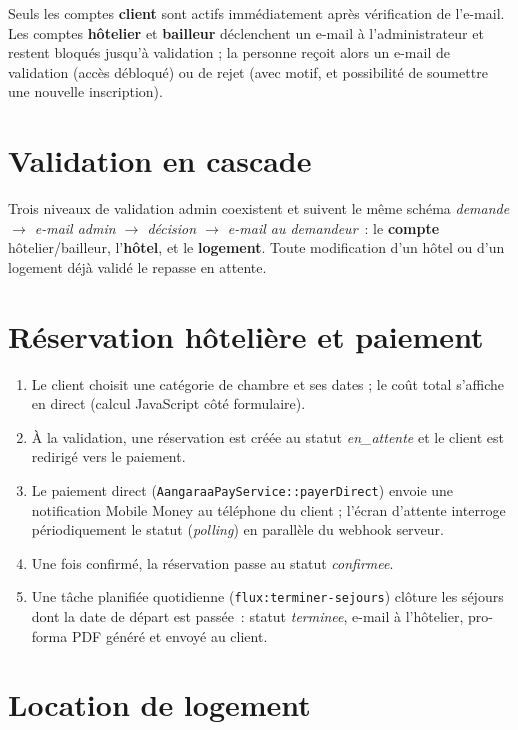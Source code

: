 \documentclass[11pt,a4paper]{report}
\newcommand{\tech}[1]{\texttt{\small #1}}
\begin{document}
Seuls les comptes \textbf{client} sont actifs immédiatement après vérification de l'e-mail. Les comptes \textbf{hôtelier} et \textbf{bailleur} déclenchent un e-mail à l'administrateur et restent bloqués jusqu'à validation ; la personne reçoit alors un e-mail de validation (accès débloqué) ou de rejet (avec motif, et possibilité de soumettre une nouvelle inscription).

\section{Validation en cascade}

\begin{noteviolet}
Trois niveaux de validation admin coexistent et suivent le même schéma \emph{demande $\rightarrow$ e-mail admin $\rightarrow$ décision $\rightarrow$ e-mail au demandeur}~: le \textbf{compte} hôtelier/bailleur, l'\textbf{hôtel}, et le \textbf{logement}. Toute modification d'un hôtel ou d'un logement déjà validé le repasse en attente.
\end{noteviolet}

\section{Réservation hôtelière et paiement}

\begin{enumerate}[leftmargin=1.2cm]
    \item Le client choisit une catégorie de chambre et ses dates ; le coût total s'affiche en direct (calcul JavaScript côté formulaire).
    \item À la validation, une réservation est créée au statut \emph{en\_attente} et le client est redirigé vers le paiement.
    \item Le paiement direct (\tech{AangaraaPayService::payerDirect}) envoie une notification Mobile Money au téléphone du client ; l'écran d'attente interroge périodiquement le statut (\emph{polling}) en parallèle du webhook serveur.
    \item Une fois confirmé, la réservation passe au statut \emph{confirmee}.
    \item Une tâche planifiée quotidienne (\tech{flux:terminer-sejours}) clôture les séjours dont la date de départ est passée~: statut \emph{terminee}, e-mail à l'hôtelier, pro-forma PDF généré et envoyé au client.
\end{enumerate}

\section{Location de logement}
\end{document}
